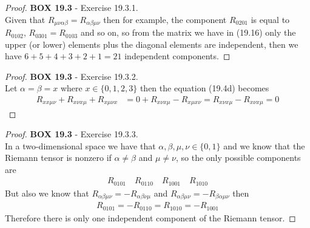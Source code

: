 \documentclass[11pt]{article}
\theoremstyle{definition}
\begin{document}
\cleardoublepage
\begin{proof}{\textbf{BOX 19.3} - Exercise 19.3.1.}\\
Given that $R_{\mu\nu\alpha\beta} = R_{\alpha\beta\mu\nu}$ then for example,
the component $R_{0201}$ is equal to $R_{0102}$, $R_{0301} = R_{0103}$ and
so on, so from the matrix we have in (19.16) only the upper (or lower) 
elements plus the diagonal elements are independent, then we have
$6 + 5+ 4+ 3+ 2+ 1 = 21$ independent components.
\end{proof}
\begin{proof}{\textbf{BOX 19.3} - Exercise 19.3.2.}\\
Let $\alpha = \beta = x$ where $x \in \{0,1,2,3\}$ then the equation (19.4d)
becomes
\begin{align*}
    R_{xx\mu\nu} + R_{x\nu x\mu} + R_{x\mu\nu x}
    &= 0 + R_{x\nu x\mu} - R_{x\mu x\nu}
    = R_{x\nu x\mu} - R_{x\nu x\mu}
    = 0
\end{align*}
\end{proof}
\begin{proof}{\textbf{BOX 19.3} - Exercise 19.3.3.}\\
In a two-dimensional space we have that $\alpha, \beta, \mu, \nu \in \{0,1\}$
and we know that the Riemann tensor is nonzero if $\alpha \neq\beta$ and
$\mu\neq\nu$, so the only possible components are
\begin{align*}
    R_{0101} \quad R_{0110} \quad R_{1001} \quad R_{1010}
\end{align*}
But also we know that $R_{\alpha\beta\mu\nu} = -R_{\alpha\beta\nu\mu}$
and $R_{\alpha\beta\mu\nu} = -R_{\beta\alpha\mu\nu}$ then
\begin{align*}
    R_{0101} = -R_{0110} = R_{1010} = -R_{1001}
\end{align*}
Therefore there is only one independent component of the Riemann tensor.
\end{proof}
\end{document}
